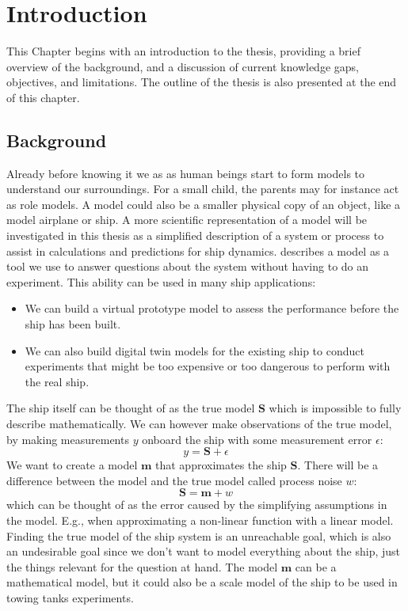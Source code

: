 \chapter{Introduction}
This Chapter begins with an introduction to the thesis, providing a brief overview of the background, and a discussion of current knowledge gaps, objectives, and limitations. The outline of the thesis is also presented at the end of this chapter.

\section{Background}
Already before knowing it we as as human beings start to form models to understand our surroundings. For a small child, the parents may for instance act as role models. A model could also be a smaller physical copy of an object, like a model airplane or ship. A more scientific representation of a model will be investigated in this thesis as a simplified description of a system or process to assist in calculations and predictions for ship dynamics.
\textcite{ljung_modeling_2021} describes a model as a tool we use to answer questions about the system without having to do an experiment. This ability can be used in many ship applications:
\vspace{0.3cm}
\begin{itemize}
    \item We can build a virtual prototype model to assess the performance before the ship has been built.
    \item We can also build digital twin models for the existing ship to conduct experiments that might be too expensive or too dangerous to perform with the real ship.
\end{itemize}
\vspace{0.3cm}
The ship itself can be thought of as the true model $\mathbf{S}$ which is impossible to fully describe mathematically. We can however make observations of the true model, by making measurements $y$ onboard the ship with some measurement error $\epsilon$:
$$
y = \mathbf{S} + \epsilon
$$
We want to create a model $\mathbf{m}$ that approximates the ship $\mathbf{S}$. There will be a difference between the model and the true model called process noise $w$:
$$
\mathbf{S} = \mathbf{m} + w
$$
which can be thought of as the error caused by the simplifying assumptions in the model. E.g., when approximating a non-linear function with a linear model.
Finding the true model of the ship system is an unreachable goal, which is also an undesirable goal since we don't want to model everything about the ship, just the things relevant for the question at hand. The model $\mathbf{m}$ can be a mathematical model, but it could also be a scale model of the ship to be used in towing tanks experiments.


